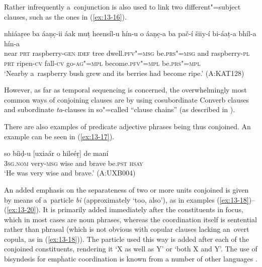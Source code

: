Rather infrequently a~conjunction is also used to link two different"=subject clauses, such as the ones in (\ref{ex:13-16}).

\begin{exe}
\ex
\label{ex:13-16}
\gll nhiáaṛee ba áaṇc̣-ii áak muṭ heensíl-u hín-u o áaṇc̣-a ba pač-í šiiy-í bi-áaṭ-a bhíl-a hín-a \\
near \textsc{prt} raspberry-\textsc{gen} \textsc{idef} tree dwell.\textsc{pfv"=msg}  be.\textsc{prs"=msg} and raspberry-\textsc{pl} \textsc{prt} ripen-\textsc{cv} fall-\textsc{cv} go-\textsc{ag"=mpl} become.\textsc{pfv"=mpl} be.\textsc{prs"=mpl} \\
\glt `Nearby a~raspberry bush grew and its berries had become ripe.' (A:KAT128) 
\end{exe}

However, as far as temporal sequencing is concerned, the overwhelmingly most common ways of conjoining clauses are by using cosubordinate Converb clauses and subordinate \textit{ta}-clauses in so"=called ``clause chains'' (as described in ).


There are also examples of predicate adjective phrases being thus conjoined. An example can be seen in (\ref{ex:13-17}).

\begin{exe}
\ex
\label{ex:13-17}
\gll so bíiḍ-u [uxiaár o hileéṛ] de maní  \\
\textsc{3sg.nom} very-\textsc{msg} wise and brave be.\textsc{pst} \textsc{hsay} \\
\glt `He was very wise and brave.' (A:UXB004) 
\end{exe}

 An added emphasis on the separateness of two or more units conjoined is given by means of a~particle \textit{bi} (approximately `too, also'), as in examples (\ref{ex:13-18})--(\ref{ex:13-20}). It is primarily added immediately after the constituents in focus, which in most cases are noun phrases, whereas the coordination itself is sentential rather than phrasal (which is not obvious with copular clauses lacking an~overt copula, as in (\ref{ex:13-18})). The particle used this way is added after each of the conjoined constituents, rendering it `X as well as Y' or `both X and Y'. The use of bisyndesis for emphatic coordination is known from a number of other languages \citep[15--17]{haspelmath2007}. 

